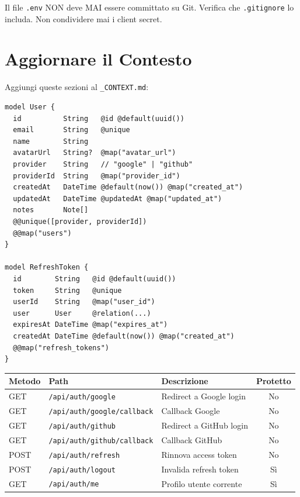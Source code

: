 \begin{dangerbox}
Il file \texttt{.env} NON deve MAI essere committato su Git. Verifica che \texttt{.gitignore} lo includa. Non condividere mai i client secret.
\end{dangerbox}

\section{Aggiornare il Contesto}

\begin{praticabox}[title={Pratica --- Sezione autenticazione nel contesto}]
Aggiungi queste sezioni al \texttt{\_CONTEXT.md}:
\end{praticabox}

\begin{lstlisting}[language={},title={Schema Database --- Tabelle User e RefreshToken}]
model User {
  id          String   @id @default(uuid())
  email       String   @unique
  name        String
  avatarUrl   String?  @map("avatar_url")
  provider    String   // "google" | "github"
  providerId  String   @map("provider_id")
  createdAt   DateTime @default(now()) @map("created_at")
  updatedAt   DateTime @updatedAt @map("updated_at")
  notes       Note[]
  @@unique([provider, providerId])
  @@map("users")
}

model RefreshToken {
  id        String   @id @default(uuid())
  token     String   @unique
  userId    String   @map("user_id")
  user      User     @relation(...)
  expiresAt DateTime @map("expires_at")
  createdAt DateTime @default(now()) @map("created_at")
  @@map("refresh_tokens")
}
\end{lstlisting}

\begin{center}
\begin{tabularx}{\textwidth}{l l X c}
\toprule
\textbf{Metodo} & \textbf{Path} & \textbf{Descrizione} & \textbf{Protetto} \\
\midrule
GET & \texttt{/api/auth/google} & Redirect a Google login & No \\
GET & \texttt{/api/auth/google/callback} & Callback Google & No \\
GET & \texttt{/api/auth/github} & Redirect a GitHub login & No \\
GET & \texttt{/api/auth/github/callback} & Callback GitHub & No \\
POST & \texttt{/api/auth/refresh} & Rinnova access token & No \\
POST & \texttt{/api/auth/logout} & Invalida refresh token & Sì \\
GET & \texttt{/api/auth/me} & Profilo utente corrente & Sì \\
\bottomrule
\end{tabularx}
\end{center}

